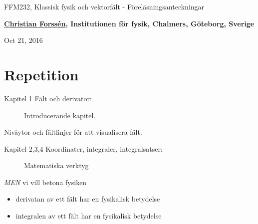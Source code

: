 \documentclass[%
oneside,                 %
final,                   %
10pt]{article}
\begin{document}






\thispagestyle{empty}

\begin{center}
{\LARGE\bf
\begin{spacing}{1.25}
FFM232, Klassisk fysik och vektorfält - Föreläsningsanteckningar
\end{spacing}
}
\end{center}


\begin{center}
{\bf \href{{http://fy.chalmers.se/subatom/tsp/}}{Christian Forssén}, Institutionen för fysik, Chalmers, Göteborg, Sverige${}^{}$} \\ [0mm]
\end{center}

\begin{center}
\end{center}
    

\begin{center}
Oct 21, 2016
\end{center}

\vspace{1cm}


\section*{Repetition}
\begin{description}
 \item[Kapitel 1 Fält och derivator:] 
   Introducerande kapitel. 
\end{description}

\noindent
Nivåytor och fältlinjer för att visualisera fält.
\begin{description}
 \item[Kapitel 2,3,4 Koordinater, integraler, integralsatser:] 
   Matematiska verktyg 
\end{description}

\noindent
\emph{MEN} vi vill betona fysiken
\begin{itemize}
   \item derivatan av ett fält har en fysikalisk betydelse

   \item integralen av ett fält har en fysikalisk betydelse
\end{itemize}
\end{document}
